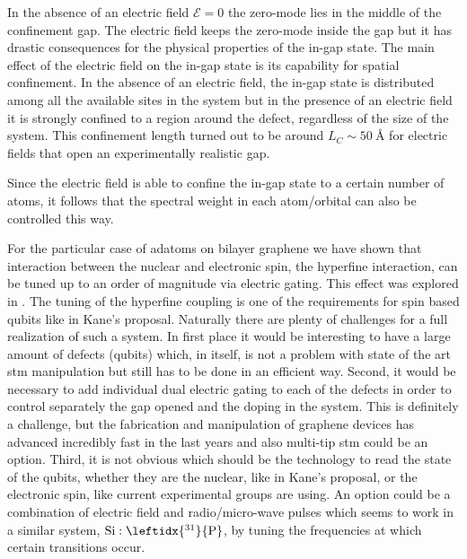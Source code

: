 In the absence of an electric field $\mathcal{E}=0$ the zero-mode lies in the middle of the confinement gap. The electric field keeps the zero-mode inside the gap but it has drastic consequences for the physical properties of the in-gap state.
The main effect of the electric field on the in-gap state is its capability for spatial confinement. In the absence of an electric field, the in-gap state is distributed among all the available sites in the system but in the presence of an electric field it is strongly confined to a region around the defect, regardless of the size of the system.
This confinement length turned out to be around $L_C\sim\SI{50}{\angstrom}$ for electric fields that open an experimentally realistic gap.

Since the electric field is able to confine the in-gap state to a certain number of atoms, it follows that the spectral weight in each atom/orbital can also be controlled this way.

For the particular case of  adatoms on bilayer graphene we have shown that interaction between the nuclear and electronic spin, the hyperfine interaction, can be tuned up to an order of magnitude via electric gating. This effect was explored in .
The tuning of the hyperfine coupling is one of the requirements for spin based qubits like in Kane's proposal. Naturally there are plenty of challenges for a full realization of such a system. In first place it would be interesting to have a large amount of defects (qubits) which, in itself, is not a problem with state of the art \ac{stm} manipulation but still has to be done in an efficient way. Second, it would be necessary to add individual dual electric gating to each of the defects in order to control separately the gap opened and the doping in the system. This is definitely a challenge, but the fabrication and manipulation of graphene devices has advanced incredibly fast in the last %
years and also multi-tip \ac{stm} could be an option.
Third, it is not obvious which should be the technology to read the state of the qubits, whether they are the nuclear, like in Kane's proposal, or the electronic spin, like current experimental groups are using. An option could be a combination of electric field and radio/micro-wave pulses which seems to work in a similar system, $\ce{Si}:\leftidx{^{31}}{\ce{P}}$, by tuning the frequencies at which certain transitions occur. %


